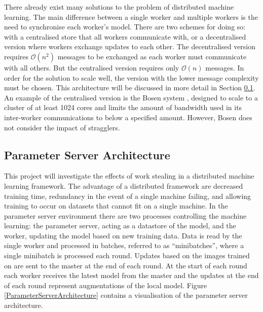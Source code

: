 \documentclass[12pt]{article}
\begin{document}
There already exist many solutions to the problem of distributed machine learning. The main difference between a single worker and multiple workers is the need to synchronise each worker's model. There are two schemes for doing so: with a centralised store that all workers communicate with, or a decentralised version where workers exchange updates to each other. The decentralised version requires $\mathcal{O}(n^2)$ messages to be exchanged as each worker must communicate with all others. But the centralised version requires only $\mathcal{O}(n)$ messages. In order for the solution to scale well, the version with the lower message complexity must be chosen. This architecture will be discussed in more detail in Section \ref{paramserver}.
\newline
\newline
An example of the centralised version is the Bosen system \cite{wei2015managed}, designed to scale to a cluster of at least 1024 cores and limits the amount of bandwidth used in its inter-worker communications to below a specified amount. However, Bosen does not consider the impact of stragglers.

\subsection{Parameter Server Architecture} \label{paramserver}
This project will investigate the effects of work stealing in a distributed machine learning framework. The advantage of a distributed framework are decreased training time, redundancy in the event of a single machine failing, and allowing training to occur on datasets that cannot fit on a single machine.
\newline
\newline
In the parameter server environment there are two processes controlling the machine learning: the parameter server, acting as a datastore of the model, and the worker, updating the model based on new training data. Data is read by the single worker and processed in batches, referred to as ``minibatches'', where a single minibatch is processed each round. Updates based on the images trained on are sent to the master at the end of each round. At the start of each round each worker receives the latest model from the master and the updates at the end of each round represent augmentations of the local model.
\newline
\newline
Figure \ref{ParameterServerArchitecture} contains a visualisation of the parameter server architecture.
\end{document}
